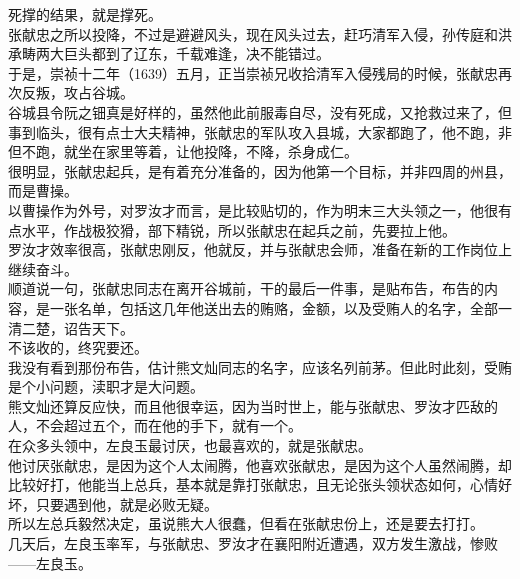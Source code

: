 \begin{multicols}{\theparacolNo}
死撑的结果，就是撑死。\\

张献忠之所以投降，不过是避避风头，现在风头过去，赶巧清军入侵，孙传庭和洪承畴两大巨头都到了辽东，千载难逢，决不能错过。\\

于是，崇祯十二年（1639）五月，正当崇祯兄收拾清军入侵残局的时候，张献忠再次反叛，攻占谷城。\\

谷城县令阮之钿真是好样的，虽然他此前服毒自尽，没有死成，又抢救过来了，但事到临头，很有点士大夫精神，张献忠的军队攻入县城，大家都跑了，他不跑，非但不跑，就坐在家里等着，让他投降，不降，杀身成仁。\\

很明显，张献忠起兵，是有着充分准备的，因为他第一个目标，并非四周的州县，而是曹操。\\

以曹操作为外号，对罗汝才而言，是比较贴切的，作为明末三大头领之一，他很有点水平，作战极狡猾，部下精锐，所以张献忠在起兵之前，先要拉上他。\\

罗汝才效率很高，张献忠刚反，他就反，并与张献忠会师，准备在新的工作岗位上继续奋斗。\\

顺道说一句，张献忠同志在离开谷城前，干的最后一件事，是贴布告，布告的内容，是一张名单，包括这几年他送出去的贿赂，金额，以及受贿人的名字，全部一清二楚，诏告天下。\\

不该收的，终究要还。\\

我没有看到那份布告，估计熊文灿同志的名字，应该名列前茅。但此时此刻，受贿是个小问题，渎职才是大问题。\\

熊文灿还算反应快，而且他很幸运，因为当时世上，能与张献忠、罗汝才匹敌的人，不会超过五个，而在他的手下，就有一个。\\

在众多头领中，左良玉最讨厌，也最喜欢的，就是张献忠。\\

他讨厌张献忠，是因为这个人太闹腾，他喜欢张献忠，是因为这个人虽然闹腾，却比较好打，他能当上总兵，基本就是靠打张献忠，且无论张头领状态如何，心情好坏，只要遇到他，就是必败无疑。\\

所以左总兵毅然决定，虽说熊大人很蠢，但看在张献忠份上，还是要去打打。\\

几天后，左良玉率军，与张献忠、罗汝才在襄阳附近遭遇，双方发生激战，惨败——左良玉。\\


\end{multicols}
